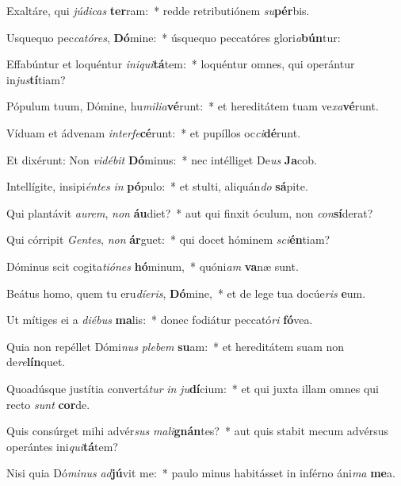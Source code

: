 \item Exaltáre, qui \textit{jú}\textit{di}\textit{cas} \textbf{ter}ram:~* redde retributiónem \textit{su}\textbf{pér}bis.
\item Usquequo pec\textit{ca}\textit{tó}\textit{res}, \textbf{Dó}mine:~* úsquequo peccatóres glori\textit{a}\textbf{bún}tur:
\item Effabúntur et loquéntur \textit{in}\textit{i}\textit{qui}\textbf{tá}tem:~* loquéntur omnes, qui operántur in\textit{jus}\textbf{tí}tiam?
\item Pópulum tuum, Dómine, hu\textit{mi}\textit{li}\textit{a}\textbf{vé}runt:~* et hereditátem tuam ve\textit{xa}\textbf{vé}runt.
\item Víduam et ádvenam \textit{in}\textit{ter}\textit{fe}\textbf{cé}runt:~* et pupíllos oc\textit{ci}\textbf{dé}runt.
\item Et dixérunt: Non \textit{vi}\textit{dé}\textit{bit} \textbf{Dó}minus:~* nec intélliget De\textit{us} \textbf{Ja}cob.
\item Intellígite, insipi\textit{én}\textit{tes} \textit{in} \textbf{pó}pulo:~* et stulti, aliquán\textit{do} \textbf{sá}pite.
\item Qui plantávit \textit{au}\textit{rem}, \textit{non} \textbf{áu}diet?~* aut qui finxit óculum, non \textit{con}\textbf{sí}derat?
\item Qui córripit \textit{Gen}\textit{tes}, \textit{non} \textbf{ár}guet:~* qui docet hóminem \textit{sci}\textbf{én}tiam?
\item Dóminus scit cogita\textit{ti}\textit{ó}\textit{nes} \textbf{hó}minum,~* quóni\textit{am} \textbf{va}næ sunt.
\item Beátus homo, quem tu eru\textit{dí}\textit{e}\textit{ris}, \textbf{Dó}mine,~* et de lege tua docúe\textit{ris} \textbf{e}um.
\item Ut mítiges ei a \textit{di}\textit{é}\textit{bus} \textbf{ma}lis:~* donec fodiátur peccató\textit{ri} \textbf{fó}vea.
\item Quia non repéllet Dómi\textit{nus} \textit{ple}\textit{bem} \textbf{su}am:~* et hereditátem suam non de\textit{re}\textbf{lín}quet.
\item Quoadúsque justítia convertá\textit{tur} \textit{in} \textit{ju}\textbf{dí}cium:~* et qui juxta illam omnes qui recto \textit{sunt} \textbf{cor}de.
\item Quis consúrget mihi advér\textit{sus} \textit{ma}\textit{li}\textbf{gnán}tes?~* aut quis stabit mecum advérsus operántes ini\textit{qui}\textbf{tá}tem?
\item Nisi quia Dó\textit{mi}\textit{nus} \textit{ad}\textbf{jú}vit me:~* paulo minus habitásset in inférno áni\textit{ma} \textbf{me}a.
